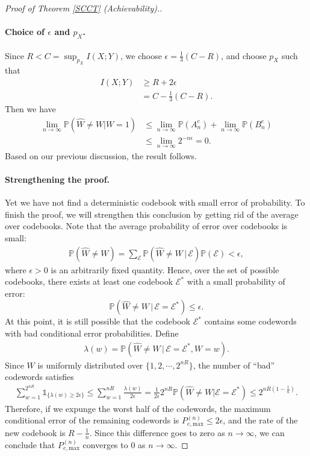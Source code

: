 \documentclass{article}
\numberwithin{equation}{section}
\newcommand{\bbP}{\mathbb{P}}
\renewcommand{\cal}{\mathcal}
\newcommand{\wh}{\widehat}
\theoremstyle{plain}
\theoremstyle{definition}
\begin{document}
\begin{proof}[Proof of Theorem \ref{SCCT} (Achievability).]
\paragraph{Choice of $\epsilon$ and $p_X$.} Since $R<C=\sup_{p_X} I(X;Y)$, we choose $\epsilon=\frac{1}{3}(C-R)$, and choose $p_X$ such that
\begin{align*}
	I(X;Y)&\geq R+2\epsilon\\
	&=C-\frac{1}{3}(C-R).
\end{align*} 
Then we have
\begin{align*}
	\lim_{n\to\infty}\bbP(\wh{W}\neq W|W=1)&\leq\lim_{n\to\infty}\bbP(A^c_n)+\lim_{n\to\infty}\bbP(B^c_n)\\
	&\leq\lim_{n\to\infty} 2^{-n\epsilon}=0.
\end{align*}
Based on our previous discussion, the result follows.

\paragraph{Strengthening the proof.} Yet we have not find a deterministic codebook with small error of probability. To finish the proof, we will strengthen this conclusion by getting rid of the average over codebooks. Note that the average probability of error over codebooks is small:
\begin{align*}
	\bbP(\wh{W}\neq W)=\sum_{\cal{E}}\bbP(\wh{W}\neq W\,|\,\cal{E})\bbP(\cal{E})<\epsilon,
\end{align*}
where $\epsilon>0$ is an arbitrarily fixed quantity. Hence, over the set of possible codebooks, there exists at least one codebook $\cal{E}^*$ with a small probability of error: $$\bbP(\wh{W}\neq W\,|\,\cal{E}=\cal{E^*})\leq\epsilon.$$ At this point, it is still possible that the codebook $\cal{E}^*$ contains some codewords with bad
conditional error probabilities. Define 
\begin{align*}
	\lambda(w)=\bbP(\wh{W}\neq W\,|\,\cal{E}=\cal{E}^*,W=w).
\end{align*}
Since $W$ is uniformly distributed over $\{1,2,\cdots,2^{nR}\}$, the number of ``bad'' codewords satisfies
\begin{align*}
	\sum_{w=1}^{2^{nR}}\mathds{1}_{\{\lambda(w)\geq 2\epsilon\}}\leq\sum_{w=1}^{nR}\frac{\lambda(w)}{2\epsilon}=\frac{1}{2\epsilon}2^{nR}\bbP(\wh{W}\neq W|\cal{E}=\cal{E^*})\leq 2^{nR\left(1-\frac{1}{n}\right)}.
\end{align*}
Therefore, if we expunge the worst half of the codewords, the maximum conditional error of the remaining codewords is $P_{e,\mathrm{max}}^{(n)}\leq 2\epsilon$, and the rate of the new codebook is
$R-\frac{1}{n}$.  Since this difference goes to zero as $n\to\infty$, we can conclude that $P_{e,\mathrm{max}}^{(n)}$ converges to $0$ as $n\to\infty$.
\end{proof}
\end{document}
